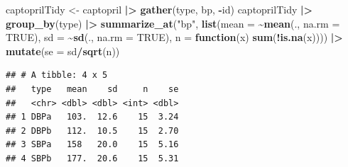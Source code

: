 \documentclass[
  12pt,dutch]{book}
\newenvironment{Shaded}{\begin{snugshade}}{\end{snugshade}}
\newcommand{\AttributeTok}[1]{\textcolor[rgb]{0.13,0.29,0.53}{#1}}
\newcommand{\ConstantTok}[1]{\textcolor[rgb]{0.56,0.35,0.01}{#1}}
\newcommand{\ControlFlowTok}[1]{\textcolor[rgb]{0.13,0.29,0.53}{\textbf{#1}}}
\newcommand{\FunctionTok}[1]{\textcolor[rgb]{0.13,0.29,0.53}{\textbf{#1}}}
\newcommand{\NormalTok}[1]{#1}
\newcommand{\OtherTok}[1]{\textcolor[rgb]{0.56,0.35,0.01}{#1}}
\newcommand{\SpecialCharTok}[1]{\textcolor[rgb]{0.81,0.36,0.00}{\textbf{#1}}}
\newcommand{\StringTok}[1]{\textcolor[rgb]{0.31,0.60,0.02}{#1}}
\theoremstyle{definition}
\theoremstyle{definition}
\theoremstyle{definition}
\theoremstyle{definition}
\theoremstyle{remark}
\begin{document}
\begin{Shaded}
\begin{Highlighting}[]
\NormalTok{captoprilTidy }\OtherTok{\textless{}{-}}\NormalTok{ captopril }\SpecialCharTok{|\textgreater{}}
    \FunctionTok{gather}\NormalTok{(type, bp, }\SpecialCharTok{{-}}\NormalTok{id)}
\NormalTok{captoprilTidy }\SpecialCharTok{|\textgreater{}}
    \FunctionTok{group\_by}\NormalTok{(type) }\SpecialCharTok{|\textgreater{}}
    \FunctionTok{summarize\_at}\NormalTok{(}\StringTok{"bp"}\NormalTok{, }\FunctionTok{list}\NormalTok{(}\AttributeTok{mean =} \SpecialCharTok{\textasciitilde{}}\FunctionTok{mean}\NormalTok{(., }\AttributeTok{na.rm =} \ConstantTok{TRUE}\NormalTok{),}
        \AttributeTok{sd =} \SpecialCharTok{\textasciitilde{}}\FunctionTok{sd}\NormalTok{(., }\AttributeTok{na.rm =} \ConstantTok{TRUE}\NormalTok{), }\AttributeTok{n =} \ControlFlowTok{function}\NormalTok{(x) }\FunctionTok{sum}\NormalTok{(}\SpecialCharTok{!}\FunctionTok{is.na}\NormalTok{(x)))) }\SpecialCharTok{|\textgreater{}}
    \FunctionTok{mutate}\NormalTok{(}\AttributeTok{se =}\NormalTok{ sd}\SpecialCharTok{/}\FunctionTok{sqrt}\NormalTok{(n))}
\end{Highlighting}
\end{Shaded}

\begin{verbatim}
## # A tibble: 4 x 5
##   type   mean    sd     n    se
##   <chr> <dbl> <dbl> <int> <dbl>
## 1 DBPa   103.  12.6    15  3.24
## 2 DBPb   112.  10.5    15  2.70
## 3 SBPa   158   20.0    15  5.16
## 4 SBPb   177.  20.6    15  5.31
\end{verbatim}
\end{document}
